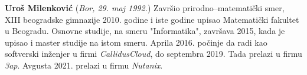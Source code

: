 \documentclass[12pt,oneside]{memoir}
\begin{document}
\frontmatter
\naslovna
\komisija
\apstrakt
\tableofcontents*

\mainmatter







\literatura

\backmatter

\begin{biografija}
 \textbf{Uroš Milenković} (\emph{Bor,
   29. maj 1992.}) Završio prirodno--matematički smer, XIII beogradske gimnazije 2010. godine 
   i iste godine upisao Matematički fakultet u Beogradu. Osnovne studije, na smeru "Informatika",
   završava 2015, kada je upisao i master studije na istom smeru. Aprila 2016. počinje da radi 
   kao softverski inženjer u firmi \emph{CallidusCloud}, do septembra 2019. Tada prelazi u 
   firmu \emph{3ap}. Avgusta 2021. prelazi u firmu \emph{Nutanix}.
\end{biografija}
\end{document}
